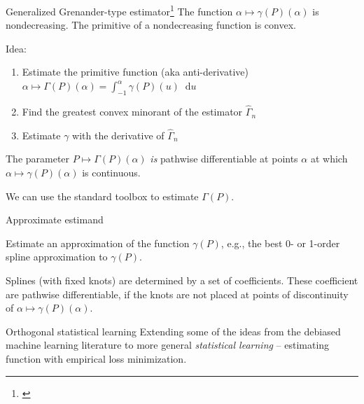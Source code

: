 \documentclass[smaller, aspectratio=169]{beamer}\usepackage{listings}
\newcommand*\diff{\mathop{}\!\mathrm{d}}
\newcommand{\1}{\mathds{1}}
\begin{document}
\begin{frame}[label={sec:org7e2eac3}]{Generalized Grenander-type estimator\footnote{\cite{westling2020unified,van2006estimating,groeneboom1983density,grenander1956theory}}}
The function \(\alpha \mapsto \gamma(P)(\alpha)\) is nondecreasing. The
primitive of a nondecreasing function is convex.

\vfill

\color{bblue}Idea\color{black}:
\begin{enumerate}
\item Estimate the primitive function (aka anti-derivative) \(\alpha
   \mapsto \Gamma(P)(\alpha) = \int_{-1}^{\alpha} \gamma(P)(u) \diff u\)
\item Find the greatest convex minorant of the estimator
\(\hat\Gamma_n\)
\item Estimate \(\gamma\) with the derivative of \(\hat\Gamma_n\)
\end{enumerate}

\vfill

The parameter \(P \mapsto \Gamma(P)(\alpha)\) \emph{is} pathwise
differentiable at points \(\alpha\) at which \(\alpha \mapsto
\gamma(P)(\alpha)\) is continuous.

\vfill

We can use the standard toolbox to estimate \(\Gamma(P)\).
\end{frame}

\begin{frame}[label={sec:org60a7845}]{Approximate estimand}
\vfill

Estimate an approximation of the function \(\gamma(P)\), e.g., the
best 0- or 1-order spline approximation to \(\gamma(P)\).

\vfill

Splines (with fixed knots) are determined by a set of coefficients.
These coefficient are pathwise differentiable, if the knots are not
placed at points of discontinuity of \(\alpha \mapsto
\gamma(P)(\alpha)\).

\vfill
\end{frame}


\begin{frame}[label={sec:orgabe3dbd}]{Orthogonal statistical learning \citep{foster2023orthogonal}}
Extending some of the ideas from the debiased machine learning
literature to more general \emph{statistical learning} -- estimating
function with empirical loss minimization.
\end{frame}
\end{document}
